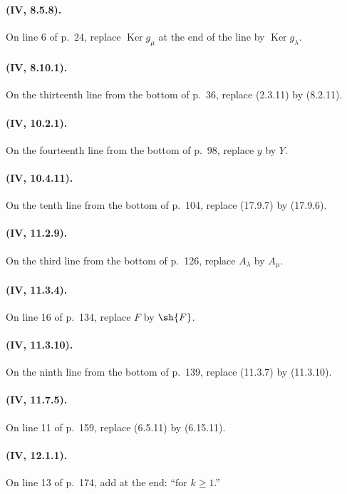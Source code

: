 \paragraph{(IV, 8.5.8).}
On line 6 of p.~24, replace $\operatorname{Ker}g_\mu$ at the end of the
line by $\operatorname{Ker}g_\lambda$.

\paragraph{(IV, 8.10.1).}
On the thirteenth line from the bottom of p.~36, replace (2.3.11) by
(8.2.11).

\paragraph{(IV, 10.2.1).}
On the fourteenth line from the bottom of p.~98, replace $y$ by $Y$.

\paragraph{(IV, 10.4.11).}
On the tenth line from the bottom of p.~104, replace (17.9.7) by
(17.9.6).

\paragraph{(IV, 11.2.9).}
On the third line from the bottom of p.~126, replace $A_\lambda$ by
$A_\mu$.

\paragraph{(IV, 11.3.4).}
On line 16 of p.~134, replace $F$ by $\sh{F}$.

\paragraph{(IV, 11.3.10).}
On the ninth line from the bottom of p.~139, replace (11.3.7) by
(11.3.10).

\paragraph{(IV, 11.7.5).}
On line 11 of p.~159, replace (6.5.11) by (6.15.11).

\paragraph{(IV, 12.1.1).}
On line 13 of p.~174, add at the end: ``for $k\geq 1$.''

